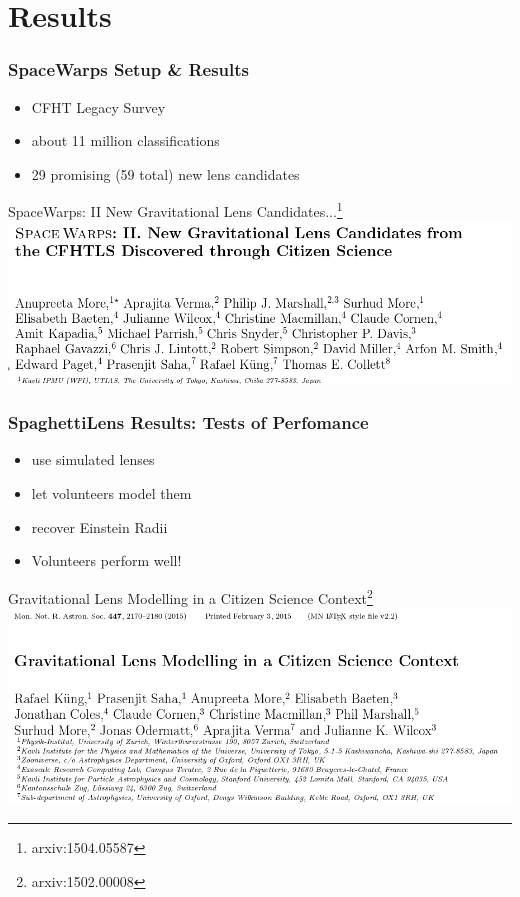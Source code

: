\documentclass[aspectratio=1610]{beamer}
\begin{document}
\section{Results}

 \begin{frame}
   \frametitle{SpaceWarps Setup \& Results}
   \begin{itemize}
     \item CFHT Legacy Survey
     \item about 11 million classifications
     \item 29 promising (59 total) new lens candidates
   \end{itemize}
   
   \begin{block}{SpaceWarps: II New Gravitational Lens Candidates...\footnote{arxiv:1504.05587}}
     \includegraphics[width=\textwidth]{imgs/paper_sw2}
   \end{block}

 \end{frame}


 \begin{frame}
   \frametitle{SpaghettiLens Results: Tests of Perfomance}
   \begin{itemize}
     \item use simulated lenses
     \item let volunteers model them
     \item recover Einstein Radii
     \item Volunteers perform well!
   \end{itemize}

   \begin{block}{Gravitational Lens Modelling in a Citizen Science Context\footnote{arxiv:1502.00008}}
     \includegraphics[width=\textwidth]{imgs/paper_sl1}
   \end{block}

 \end{frame}
\end{document}
